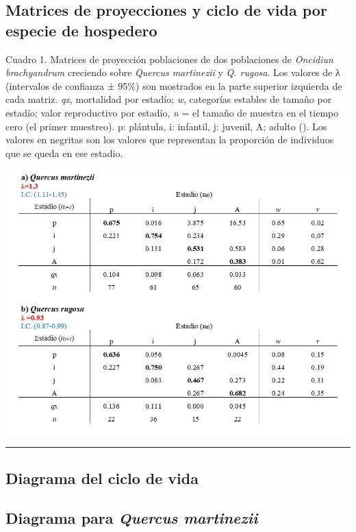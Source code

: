 \documentclass[
]{book}
\theoremstyle{definition}
\theoremstyle{definition}
\theoremstyle{definition}
\theoremstyle{definition}
\theoremstyle{remark}
\begin{document}
\subsection{Matrices de proyecciones y ciclo de vida por especie de hospedero}\label{matrices-de-proyecciones-y-ciclo-de-vida-por-especie-de-hospedero}

Cuadro 1. Matrices de proyección poblaciones de dos poblaciones de \emph{Oncidiun brachyandrum} creciendo sobre \emph{Quercus martinezii} y \emph{Q. rugosa}. Los valores de λ (intervalos de confianza ± 95\%) son mostrados en la parte superior izquierda de cada matriz. \emph{qx}, mortalidad por estadío; \emph{w}, categorías estables de tamaño por estadío; valor reproductivo por estadío, \emph{n} = el tamaño de muestra en el tiempo cero (el primer muestreo). p: plántula, i: infantil, j: juvenil, A; adulto (\citet{ramirez2021host}). Los valores en negritas son los valores que representan la proporción de individuos que se queda en ese estadio.

\includegraphics{Figures/imagen1.jpg}

\begin{center}\rule{0.5\linewidth}{0.5pt}\end{center}

\subsection{Diagrama del ciclo de vida}\label{diagrama-del-ciclo-de-vida}

\subsection{\texorpdfstring{Diagrama para \emph{Quercus martinezii}}{Diagrama para Quercus martinezii}}\label{diagrama-para-quercus-martinezii}
\end{document}
